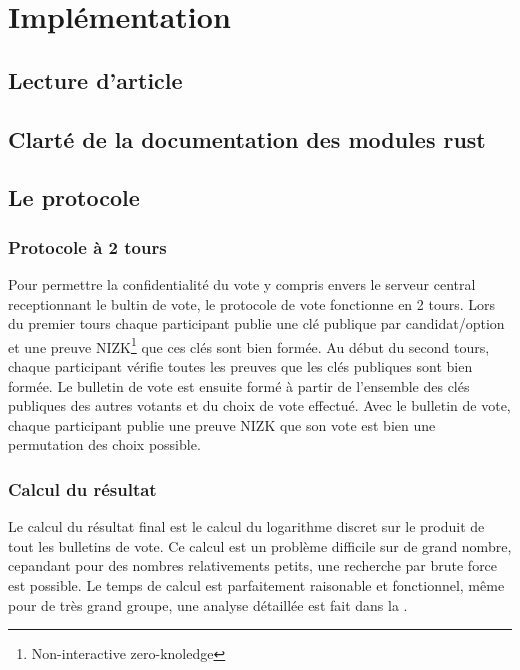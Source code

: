 \documentclass[../report]{subfiles}
\begin{document}
\part{Implémentation}



\chapter{Lecture d'article}
\chapter{Clarté de la documentation des modules rust}

\chapter{Le protocole}

\section{Protocole à 2 tours}

Pour permettre la confidentialité du vote y compris envers le serveur central receptionnant
le bultin de vote, le protocole de vote fonctionne en 2 tours.
Lors du premier tours chaque participant publie une clé publique par candidat/option et une 
preuve NIZK\footnote{Non-interactive zero-knoledge} que ces clés sont bien formée.
Au début du second tours, chaque participant vérifie toutes les preuves que les clés publiques
sont bien formée.
Le bulletin de vote est ensuite formé à partir de l'ensemble des clés publiques des autres 
votants et du choix de vote effectué.
Avec le bulletin de vote, chaque participant publie une preuve NIZK que son vote est bien 
une permutation des choix possible.

\section{Calcul du résultat}\label{sec:res:proto:resultat}

Le calcul du résultat final est le calcul du logarithme discret sur le produit de tout les 
bulletins de vote.
Ce calcul est un problème difficile sur de grand nombre, cepandant pour des nombres 
relativements petits, une recherche par brute force est possible.
Le temps de calcul est parfaitement raisonable et fonctionnel, même pour de très grand groupe, 
une analyse détaillée est fait dans la .
\end{document}
